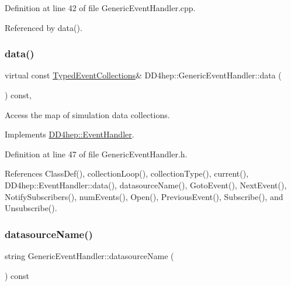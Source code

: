 Definition at line 42 of file Generic\+Event\+Handler.\+cpp.



Referenced by data().

\hypertarget{class_d_d4hep_1_1_generic_event_handler_ad4d0029a1db989c61a3bbb72f299f12e}{}\label{class_d_d4hep_1_1_generic_event_handler_ad4d0029a1db989c61a3bbb72f299f12e} 
\subsubsection{\texorpdfstring{data()}{data()}}
{\footnotesize\ttfamily virtual const \hyperlink{class_d_d4hep_1_1_event_handler_a4d441ff8a824b1e2f278e8b7a6391af3}{Typed\+Event\+Collections}\& D\+D4hep\+::\+Generic\+Event\+Handler\+::data (\begin{DoxyParamCaption}{ }\end{DoxyParamCaption}) const\hspace{0.3cm}{\ttfamily [inline]}, {\ttfamily [virtual]}}



Access the map of simulation data collections. 



Implements \hyperlink{class_d_d4hep_1_1_event_handler_a263d136331d72994bcbf537d4aa16d4f}{D\+D4hep\+::\+Event\+Handler}.



Definition at line 47 of file Generic\+Event\+Handler.\+h.



References Class\+Def(), collection\+Loop(), collection\+Type(), current(), D\+D4hep\+::\+Event\+Handler\+::data(), datasource\+Name(), Goto\+Event(), Next\+Event(), Notify\+Subscribers(), num\+Events(), Open(), Previous\+Event(), Subscribe(), and Unsubscribe().

\hypertarget{class_d_d4hep_1_1_generic_event_handler_a3d99aeaf1bcd8aa421ecab3bcf5fabe0}{}\label{class_d_d4hep_1_1_generic_event_handler_a3d99aeaf1bcd8aa421ecab3bcf5fabe0} 
\subsubsection{\texorpdfstring{datasource\+Name()}{datasourceName()}}
{\footnotesize\ttfamily string Generic\+Event\+Handler\+::datasource\+Name (\begin{DoxyParamCaption}{ }\end{DoxyParamCaption}) const\hspace{0.3cm}{\ttfamily [virtual]}}



